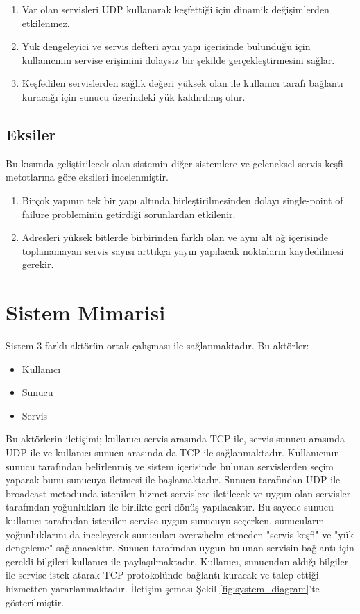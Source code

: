 \documentclass[12pt]{article}
\begin{document}
\begin{justify}
\begin{enumerate}
    \item Var olan servisleri UDP kullanarak keşfettiği için dinamik değişimlerden etkilenmez.
    \item Yük dengeleyici ve servis defteri aynı yapı içerisinde bulunduğu için kullanıcının servise erişimini dolaysız bir şekilde gerçekleştirmesini sağlar.
    \item Keşfedilen servislerden sağlık değeri yüksek olan ile kullanıcı tarafı bağlantı kuracağı için sunucu üzerindeki yük kaldırılmış olur.
\end{enumerate}

\subsection{Eksiler}
Bu kısımda geliştirilecek olan sistemin diğer sistemlere ve geleneksel servis keşfi metotlarına göre eksileri incelenmiştir.

\begin{enumerate}
    \item Birçok yapının tek bir yapı altında birleştirilmesinden dolayı single-point of failure probleminin getirdiği sorunlardan etkilenir.
    \item Adresleri yüksek bitlerde birbirinden farklı olan ve aynı alt ağ içerisinde toplanamayan servis sayısı arttıkça yayın yapılacak noktaların kaydedilmesi gerekir.
\end{enumerate}

\section{Sistem Mimarisi}

Sistem 3 farklı aktörün ortak çalışması ile sağlanmaktadır. Bu aktörler:
\begin{itemize}
    \item Kullanıcı
    \item Sunucu
    \item Servis
\end{itemize}
Bu aktörlerin iletişimi; kullanıcı-servis arasında TCP ile, servis-sunucu arasında UDP ile ve kullanıcı-sunucu arasında da TCP ile sağlanmaktadır. Kullanıcının sunucu tarafından belirlenmiş ve sistem içerisinde bulunan servislerden seçim yaparak bunu sunucuya iletmesi ile başlamaktadır. Sunucu tarafından UDP ile broadcast metodunda istenilen hizmet servislere iletilecek ve uygun olan servisler tarafından yoğunlukları ile birlikte geri dönüş yapılacaktır. Bu sayede sunucu kullanıcı tarafından istenilen servise uygun sunucuyu seçerken, sunucuların yoğunluklarını da inceleyerek sunucuları overwhelm etmeden "servis keşfi" ve "yük dengeleme" sağlanacaktır. Sunucu tarafından uygun bulunan servisin bağlantı için gerekli bilgileri kullanıcı ile paylaşılmaktadır. Kullanıcı, sunucudan aldığı bilgiler ile servise istek atarak TCP protokolünde bağlantı kuracak ve talep ettiği hizmetten yararlanmaktadır. İletişim şeması Şekil \ref{fig:system_diagram}'te gösterilmiştir.


\end{justify}
\end{document}
